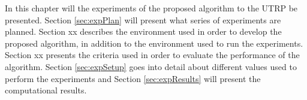 In this chapter will the experiments of the proposed algorithm to the UTRP be presented. Section \vref{sec:expPlan} will present what series of experiments are planned. Section xx describes the environment used in order to develop the proposed algorithm, in addition to the environment used to run the experiments. Section xx presents the criteria used in order to evaluate the performance of the algorithm. Section \vref{sec:expSetup} goes into detail about different values used to perform the experiments and Section \vref{sec:expResults} will present the computational results. 

 

